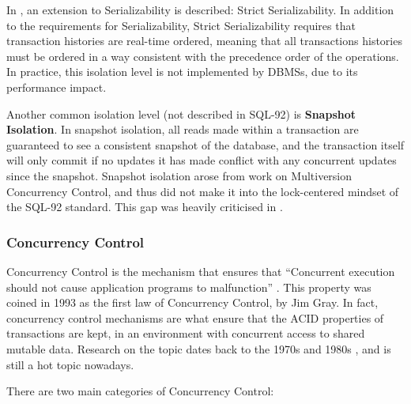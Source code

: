\documentclass{llncs}
\begin{document}
In \cite{papadimitriou1979serializability}, an extension to
Serializability is described: Strict Serializability. In addition to
the requirements for Serializability, Strict Serializability requires
that transaction histories are real-time ordered, meaning that all
transactions histories must be ordered in a way consistent with the
precedence order of the operations. In practice, this isolation level
is not implemented by DBMSs, due to its performance impact.

Another common isolation level (not described in SQL-92) is {\bf
  Snapshot Isolation}. In snapshot isolation, all reads made within a
transaction are guaranteed to see a consistent snapshot of the
database, and the transaction itself will only commit if no updates it
has made conflict with any concurrent updates since the
snapshot. Snapshot isolation arose from work on Multiversion
Concurrency Control, and thus did not make it into the lock-centered
mindset of the SQL-92 standard. This gap was heavily criticised in
\cite{berenson1995critique}.

\subsubsection{Concurrency Control}

Concurrency Control is the mechanism that ensures that ``Concurrent
execution should not cause application programs to malfunction''
\cite{reuter1993transaction}. This property was coined in 1993 as the
first law of Concurrency Control, by Jim Gray. In fact, concurrency
control mechanisms are what ensure that the ACID properties of
transactions are kept, in an environment with concurrent access to
shared mutable data. Research on the topic dates back to the 1970s
\cite{rosenkrantz1978system} and 1980s \cite{gray1981transaction}, and
is still a hot topic nowadays.

There are two main categories of Concurrency Control:
\end{document}
